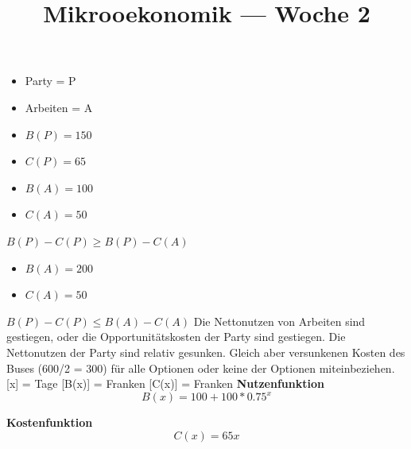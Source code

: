 \documentclass[a4paper]{article}
\title{\textbf{Mikrooekonomik — Woche 2}}
\begin{document}
    \maketitle
   
    \break
   \begin{itemize}
        \item Party = P 
        \item Arbeiten = A
        \item $ B(P) = 150$
        \item $ C(P) = 65$
   \end{itemize}
        
        \begin{itemize}
            \item $B(A) = 100$
            \item $C(A) = 50$
        \end{itemize}
        $B(P) - C(P) \ge B(P) - C(A)$
        \begin{itemize}
            \item $B(A) = 200$
            \item $C(A) = 50$
        \end{itemize}
        $B(P) - C(P) \le B(A) - C(A)$
        Die Nettonutzen von Arbeiten sind gestiegen, oder die Opportunitätskosten der Party sind gestiegen. Die Nettonutzen der Party sind relativ gesunken.
        Gleich aber versunkenen Kosten des Buses (600/2 = 300) für alle Optionen oder keine der Optionen miteinbeziehen.
    [x] = Tage
    [B(x)] = Franken
    [C(x)] = Franken
    \textbf{Nutzenfunktion}
    \begin{equation}
        B(x) = 100 + 100 * 0.75^x
    \end{equation}

    \textbf{Kostenfunktion}
    \begin{equation}
        C(x) = 65x
    \end{equation}
\end{document}
